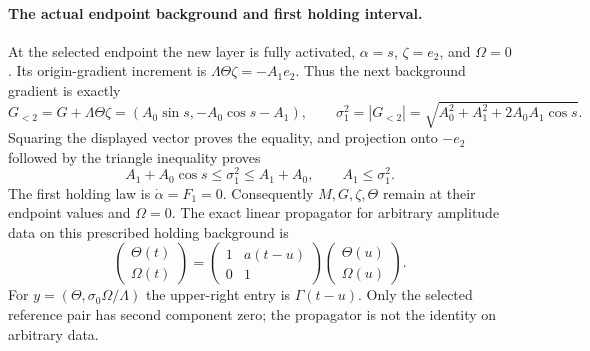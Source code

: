\documentclass[11pt]{article}
\begin{document}
\paragraph{The actual endpoint background and first holding interval.}
At the selected endpoint the new layer is fully activated,
$\alpha=s$, $\zeta=e_2$, and $\Omega=0$. Its origin-gradient
increment is $\Lambda\Theta\zeta=-A_1e_2$. Thus the next
background gradient is exactly
\begin{equation}\label{eq:nextG}
 G_{<2}=G+\Lambda\Theta\zeta
 =(A_0\sin s,-A_0\cos s-A_1),\qquad
 \sigma _1^2=|G_{<2}|
 =\sqrt{A_0^2+A_1^2+2A_0A_1\cos s}.
\end{equation}
Squaring the displayed vector proves the equality, and projection onto
$-e_2$ followed by the triangle inequality proves
\[
 A_1+A_0\cos s\leq\sigma _1^2\leq A_1+A_0,
 \qquad A_1\leq\sigma _1^2.
\]
The first holding law is $\dot\alpha=F_1=0$.
Consequently $M,G,\zeta,\Theta$ remain at their endpoint values and
$\Omega=0$. The exact linear propagator for arbitrary amplitude data
on this prescribed holding background is
\[
 \begin{pmatrix}\Theta(t)\\\Omega(t)\end{pmatrix}
 =\begin{pmatrix}1&a(t-u)\\0&1\end{pmatrix}
 \begin{pmatrix}\Theta(u)\\\Omega(u)\end{pmatrix}.
\]
For $y=(\Theta,\sigma _0\Omega/\Lambda)$ the upper-right entry is
$\Gamma(t-u)$. Only the selected reference pair has second component
zero; the propagator is not the identity on arbitrary data.
\end{document}
